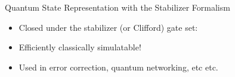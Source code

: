 \begin{frame}{Quantum State Representation with the
					\alert{Stabilizer Formalism}}
\begin{definition}
\begin{itemize}
with $P_{i,1} \otimes  P_{i,2} \otimes  \dots  \otimes P_{i,n} \cdot \ket{\phi} = \ket{\phi}$ (state $\ket{\phi}$ is stabilized by each Pauli op.)

\pause

\item Closed under the stabilizer (or Clifford) gate set: 

\item Efficiently classically simulatable!
\pause
\item \alert{Used in error correction, quantum networking, etc etc.}
\end{itemize}
\end{definition}



\end{frame}




